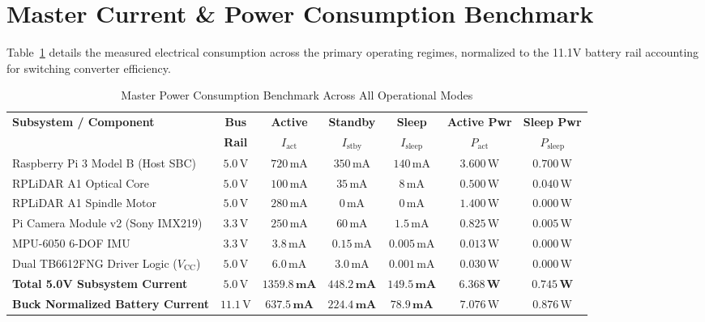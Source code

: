 \documentclass[11pt,a4paper]{article}
\begin{document}
\section{Master Current \& Power Consumption Benchmark}

Table~\ref{tab:power_benchmark} details the measured electrical consumption across the primary operating regimes, normalized to the 11.1V battery rail accounting for switching converter efficiency.

\begin{table}[htbp]
\centering
\small
\renewcommand{\arraystretch}{1.15}
\caption{Master Power Consumption Benchmark Across All Operational Modes}
\label{tab:power_benchmark}
\begin{tabularx}{\textwidth}{>{\raggedright\arraybackslash}X c c c c c c}
\toprule
\textbf{Subsystem / Component} & \textbf{Bus} & \textbf{Active} & \textbf{Standby} & \textbf{Sleep} & \textbf{Active Pwr} & \textbf{Sleep Pwr} \\
 & \textbf{Rail} & $I_{\text{act}}$ & $I_{\text{stby}}$ & $I_{\text{sleep}}$ & $P_{\text{act}}$ & $P_{\text{sleep}}$ \\
\midrule
Raspberry Pi 3 Model B (Host SBC) & $5.0\,\text{V}$ & $720\,\text{mA}$ & $350\,\text{mA}$ & $140\,\text{mA}$ & $3.600\,\text{W}$ & $0.700\,\text{W}$ \\
RPLiDAR A1 Optical Core & $5.0\,\text{V}$ & $100\,\text{mA}$ & $35\,\text{mA}$ & $8\,\text{mA}$ & $0.500\,\text{W}$ & $0.040\,\text{W}$ \\
RPLiDAR A1 Spindle Motor & $5.0\,\text{V}$ & $280\,\text{mA}$ & $0\,\text{mA}$ & $0\,\text{mA}$ & $1.400\,\text{W}$ & $0.000\,\text{W}$ \\
Pi Camera Module v2 (Sony IMX219) & $3.3\,\text{V}$ & $250\,\text{mA}$ & $60\,\text{mA}$ & $1.5\,\text{mA}$ & $0.825\,\text{W}$ & $0.005\,\text{W}$ \\
MPU-6050 6-DOF IMU & $3.3\,\text{V}$ & $3.8\,\text{mA}$ & $0.15\,\text{mA}$ & $0.005\,\text{mA}$ & $0.013\,\text{W}$ & $0.000\,\text{W}$ \\
Dual TB6612FNG Driver Logic ($V_{\text{CC}}$) & $5.0\,\text{V}$ & $6.0\,\text{mA}$ & $3.0\,\text{mA}$ & $0.001\,\text{mA}$ & $0.030\,\text{W}$ & $0.000\,\text{W}$ \\
\midrule
\textbf{Total 5.0V Subsystem Current} & $5.0\,\text{V}$ & $\mathbf{1359.8\,\text{mA}}$ & $\mathbf{448.2\,\text{mA}}$ & $\mathbf{149.5\,\text{mA}}$ & $\mathbf{6.368\,\text{W}}$ & $\mathbf{0.745\,\text{W}}$ \\
\textbf{Buck Normalized Battery Current} & $11.1\,\text{V}$ & $\mathbf{637.5\,\text{mA}}$ & $\mathbf{224.4\,\text{mA}}$ & $\mathbf{78.9\,\text{mA}}$ & $7.076\,\text{W}$ & $0.876\,\text{W}$ \\

\end{tabularx}
\end{table}
\end{document}
